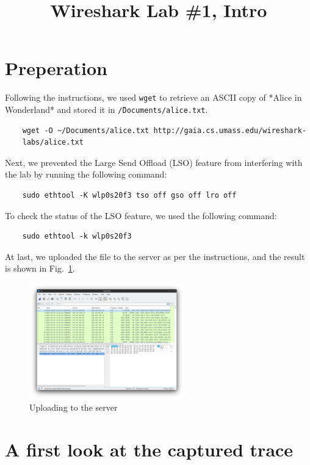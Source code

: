 \documentclass{cshwk}
\title{Wireshark Lab \#1, Intro}
\begin{document}
\maketitle

\section{Preperation}

Following the instructions, we used \texttt{wget} to retrieve an ASCII copy of *Alice in Wonderland* and stored it in \texttt{\~/Documents/alice.txt}.
\begin{verbatim}
    wget -O ~/Documents/alice.txt http://gaia.cs.umass.edu/wireshark-
    labs/alice.txt
\end{verbatim}
Next, we prevented the Large Send Offload (LSO) feature from interfering with the lab by running the following command:
\begin{verbatim}
    sudo ethtool -K wlp0s20f3 tso off gso off lro off
\end{verbatim}
To check the status of the LSO feature, we used the following command:
\begin{verbatim}
    sudo ethtool -k wlp0s20f3
\end{verbatim}

At last, we uploaded the file to the server as per the instructions, and the result is shown in Fig.~\ref{fig:Uploading}.


\begin{figure}[htbp]
    \centering
    \includegraphics[width=0.6\textwidth]{./lab3-1.png}
    \caption{Uploading to the server}
    \label{fig:Uploading}
\end{figure}

\section{A first look at the captured trace}
\end{document}
